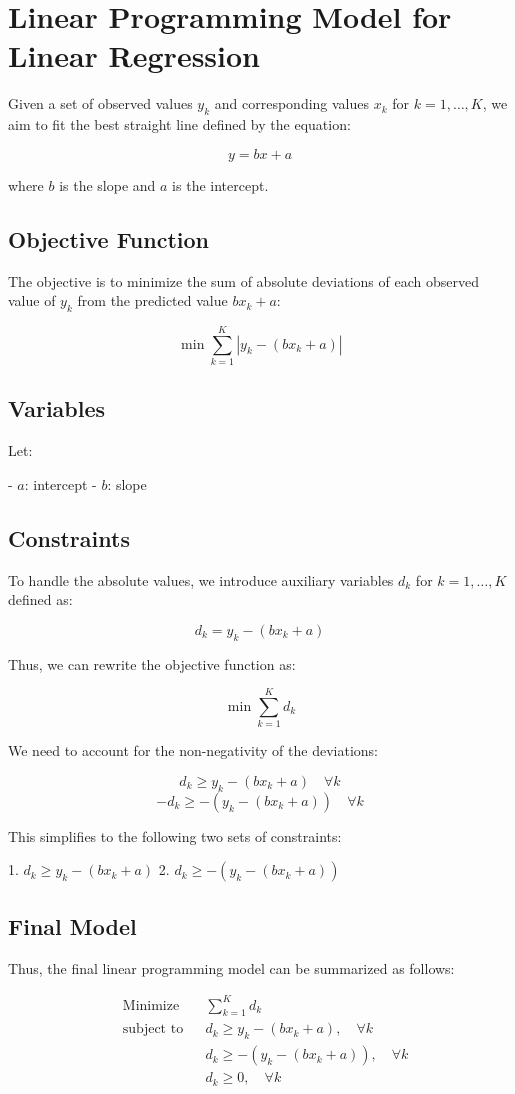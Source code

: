 \documentclass{article}
\begin{document}
\section*{Linear Programming Model for Linear Regression}

Given a set of observed values \( y_k \) and corresponding values \( x_k \) for \( k = 1, \ldots, K \), we aim to fit the best straight line defined by the equation:

\[
y = bx + a
\]

where \( b \) is the slope and \( a \) is the intercept.

\subsection*{Objective Function}

The objective is to minimize the sum of absolute deviations of each observed value of \( y_k \) from the predicted value \( bx_k + a \):

\[
\min \sum_{k=1}^{K} |y_k - (bx_k + a)|
\]

\subsection*{Variables}

Let:

- \( a \): intercept
- \( b \): slope

\subsection*{Constraints}

To handle the absolute values, we introduce auxiliary variables \( d_k \) for \( k = 1, \ldots, K \) defined as:

\[
d_k = y_k - (bx_k + a)
\]

Thus, we can rewrite the objective function as:

\[
\min \sum_{k=1}^{K} d_k
\]

We need to account for the non-negativity of the deviations:

\[
d_k \geq y_k - (bx_k + a) \quad \forall k
\]
\[
-d_k \geq -(y_k - (bx_k + a)) \quad \forall k
\]

This simplifies to the following two sets of constraints:

1. \( d_k \geq y_k - (bx_k + a) \)
2. \( d_k \geq -(y_k - (bx_k + a)) \)

\subsection*{Final Model}

Thus, the final linear programming model can be summarized as follows:

\[
\begin{aligned}
    & \text{Minimize} && \sum_{k=1}^{K} d_k \\
    & \text{subject to} && d_k \geq y_k - (bx_k + a), \quad \forall k \\
    & && d_k \geq -(y_k - (bx_k + a)), \quad \forall k \\
    & && d_k \geq 0, \quad \forall k \\
\end{aligned}
\]
\end{document}
